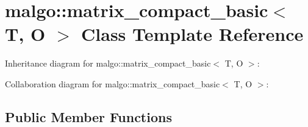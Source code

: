 \hypertarget{classmalgo_1_1matrix__compact__basic}{}\section{malgo\+:\+:matrix\+\_\+compact\+\_\+basic$<$ T, O $>$ Class Template Reference}
\label{classmalgo_1_1matrix__compact__basic}


Inheritance diagram for malgo\+:\+:matrix\+\_\+compact\+\_\+basic$<$ T, O $>$\+:


Collaboration diagram for malgo\+:\+:matrix\+\_\+compact\+\_\+basic$<$ T, O $>$\+:
\subsection*{Public Member Functions}
